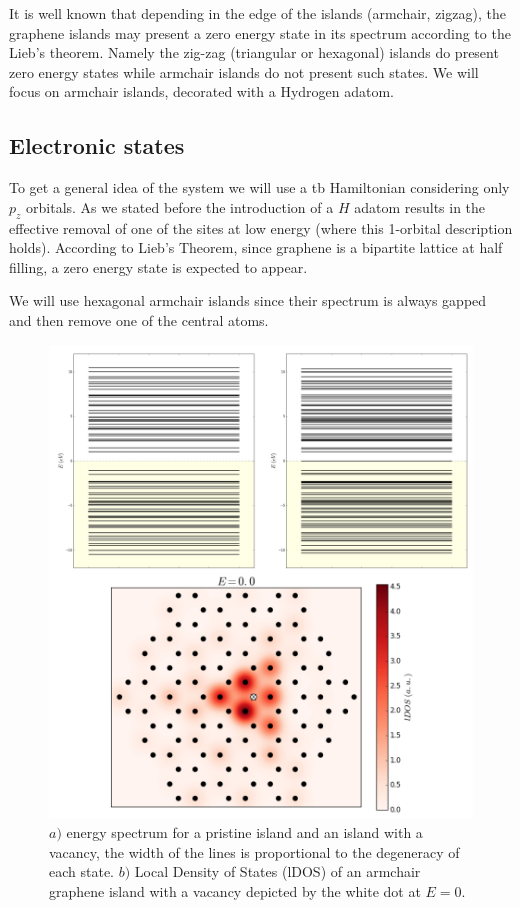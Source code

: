 It is well known that depending in the edge of the islands (armchair, zigzag), the graphene islands may present a zero energy state in its spectrum according to the Lieb's theorem. Namely the zig-zag (triangular or hexagonal) islands do present zero energy states while armchair islands do not present such states.
We will focus on armchair islands, decorated with a Hydrogen adatom.


\subsection{Electronic states}
To get a general idea of the system we will use a \ac{tb} Hamiltonian considering only $p_z$ orbitals. As we stated before the introduction of a $H$ adatom results in the effective removal of one of the sites at low energy (where this 1-orbital description holds). According to Lieb's Theorem, since graphene is a bipartite lattice at half filling, a zero energy state is expected to appear.

We will use hexagonal armchair islands since their spectrum is always gapped and then remove one of the central atoms.

\begin{figure}[h!]
\centering
\includegraphics{chapter05/figures/espectro.png}
\vspace{-5pt}
\caption{$a)$ energy spectrum for a pristine island and an island with a vacancy, the width of the lines is proportional to the degeneracy of each state. $b)$ Local Density of States (lDOS) of an armchair graphene island with a vacancy depicted by the white dot at $E=0$.}
\label{spectrum}
\end{figure}
\FloatBarrier

